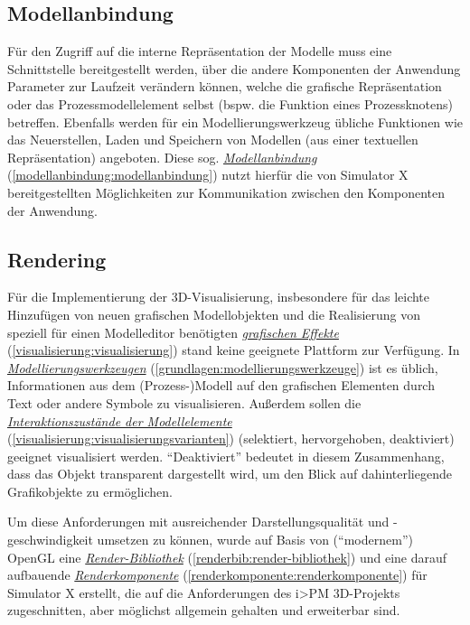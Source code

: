 \documentclass[a4paper,10pt]{sphinxmanual}
\begin{document}
\subsection{Modellanbindung}
\label{einleitung:modellanbindung}
Für den Zugriff auf die interne Repräsentation der Modelle muss eine Schnittstelle bereitgestellt werden, über die andere Komponenten der Anwendung Parameter zur Laufzeit verändern können, welche die grafische Repräsentation oder das Prozessmodellelement selbst (bspw. die Funktion eines Prozessknotens) betreffen.
Ebenfalls werden für ein Modellierungswerkzeug übliche Funktionen wie das Neuerstellen, Laden und Speichern von Modellen (aus einer textuellen Repräsentation) angeboten.
Diese sog. {\hyperref[modellanbindung:modellanbindung]{\emph{Modellanbindung}}} (\autoref*{modellanbindung:modellanbindung}) nutzt hierfür die von Simulator X bereitgestellten Möglichkeiten zur Kommunikation zwischen den Komponenten der Anwendung.


\subsection{Rendering}
\label{einleitung:rendering}
Für die Implementierung der 3D-Visualisierung, insbesondere für das leichte Hinzufügen von neuen grafischen Modellobjekten und die Realisierung von speziell für einen Modelleditor benötigten {\hyperref[visualisierung:visualisierung]{\emph{grafischen Effekte}}} (\autoref*{visualisierung:visualisierung}) stand keine geeignete Plattform zur Verfügung.
In {\hyperref[grundlagen:modellierungswerkzeuge]{\emph{Modellierungswerkzeugen}}} (\autoref*{grundlagen:modellierungswerkzeuge}) ist es üblich, Informationen aus dem (Prozess-)Modell auf den grafischen Elementen durch Text oder andere Symbole zu visualisieren.
Außerdem sollen die {\hyperref[visualisierung:visualisierungsvarianten]{\emph{Interaktionszustände der Modellelemente}}} (\autoref*{visualisierung:visualisierungsvarianten}) (selektiert, hervorgehoben, deaktiviert) geeignet visualisiert werden.
"`Deaktiviert"' bedeutet in diesem Zusammenhang, dass das Objekt transparent dargestellt wird, um den Blick auf dahinterliegende Grafikobjekte zu ermöglichen.

Um diese Anforderungen mit ausreichender Darstellungsqualität und -geschwindigkeit umsetzen zu können, wurde auf Basis von ("`modernem"') OpenGL eine {\hyperref[renderbib:render-bibliothek]{\emph{Render-Bibliothek}}} (\autoref*{renderbib:render-bibliothek}) und eine darauf aufbauende {\hyperref[renderkomponente:renderkomponente]{\emph{Renderkomponente}}} (\autoref*{renderkomponente:renderkomponente}) für Simulator X erstellt, die auf die Anforderungen des i\textgreater{}PM 3D-Projekts zugeschnitten, aber möglichst allgemein gehalten und erweiterbar sind.
\end{document}
